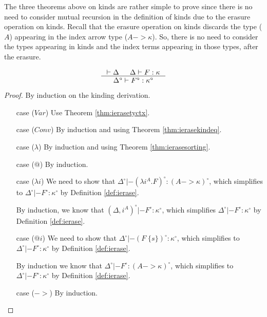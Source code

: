 The three theorems above on kinds are rather simple to prove since there is
no need to consider mutual recursion in the definition of kinds due to
the erasure operation on kinds. Recall that the erasure operation on kinds
discards the type ($A$) appearing in the index arrow type ($A -> \kappa$).
So, there is no need to consider the types appearing in kinds
and the index terms appearing in those types, after the erasure.\\

\begin{theorem}
\label{thm:ierasekinding}
\[ \inference{|- \Delta & \Delta |- F : \kappa}
		{\Delta^\circ |- F^\circ : \kappa^\circ}
\]
\end{theorem}
\begin{proof}
	By induction on the kinding derivation.
\begin{itemize}
\item[case] ($Var$)
	Use Theorem \ref{thm:ierasetyctx}.

\item[case] ($Conv$)
	By induction and using Theorem \ref{thm:ierasekindeq}.

\item[case] ($\lambda$)
	By induction and using Theorem \ref{thm:ierasesorting}.

\item[case] ($@$)
	By induction.

\item[case] ($\lambda i$)
	We need to show that
	$\Delta^\circ |- (\lambda i^A.F)^\circ : (A -> \kappa)^\circ$,
	which simplifies to $\Delta^\circ |- F^\circ : \kappa^\circ$
	by Definition \ref{def:ierase}.

	By induction, we know that
	$(\Delta,i^A)^\circ |- F^\circ : \kappa^\circ $,
	which simplifies $\Delta^\circ |- F^\circ : \kappa^\circ$
	by Definition \ref{def:ierase}.

\item[case] ($@ i$)
	We need to show that
	$\Delta^\circ |- (F\;\{s\})^\circ : \kappa^\circ$,
	which simplifies to $\Delta^\circ |- F^\circ : \kappa^\circ$
	by Definition \ref{def:ierase}.

	By induction we know that
	$\Delta^\circ |- F^\circ : (A -> \kappa)^\circ$,
	which simplifies to $\Delta^\circ |- F^\circ : \kappa^\circ$
	by Definition \ref{def:ierase}.

\item[case] ($->$)
	By induction.


\end{itemize}
\end{proof}
